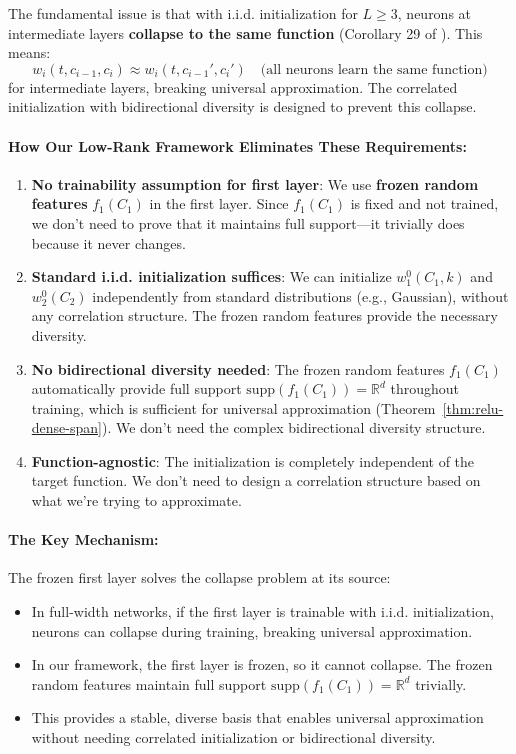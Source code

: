 \documentclass[11pt]{article}
\newcommand{\1}{\mathbbm{1}}
\begin{document}
The fundamental issue is that with i.i.d. initialization for $L \ge 3$, neurons at intermediate layers \textbf{collapse to the same function} (Corollary 29 of \cite{nguyen2023rigorousframeworkmeanfield}). This means:
\[
w_i(t, c_{i-1}, c_i) \approx w_i(t, c_{i-1}', c_i') \quad \text{(all neurons learn the same function)}
\]
for intermediate layers, breaking universal approximation. The correlated initialization with bidirectional diversity is designed to prevent this collapse.

\paragraph*{How Our Low-Rank Framework Eliminates These Requirements:}

\begin{enumerate}
\item \textbf{No trainability assumption for first layer}: We use \textbf{frozen random features} $f_1(C_1)$ in the first layer. Since $f_1(C_1)$ is fixed and not trained, we don't need to prove that it maintains full support---it trivially does because it never changes.

\item \textbf{Standard i.i.d. initialization suffices}: We can initialize $w_1^0(C_1, k)$ and $w_2^0(C_2)$ independently from standard distributions (e.g., Gaussian), without any correlation structure. The frozen random features provide the necessary diversity.

\item \textbf{No bidirectional diversity needed}: The frozen random features $f_1(C_1)$ automatically provide full support $\text{supp}(f_1(C_1)) = \mathbb{R}^d$ throughout training, which is sufficient for universal approximation (Theorem~\ref{thm:relu-dense-span}). We don't need the complex bidirectional diversity structure.

\item \textbf{Function-agnostic}: The initialization is completely independent of the target function. We don't need to design a correlation structure based on what we're trying to approximate.
\end{enumerate}

\paragraph*{The Key Mechanism:}

The frozen first layer solves the collapse problem at its source:
\begin{itemize}
\item In full-width networks, if the first layer is trainable with i.i.d. initialization, neurons can collapse during training, breaking universal approximation.
\item In our framework, the first layer is frozen, so it cannot collapse. The frozen random features maintain full support $\text{supp}(f_1(C_1)) = \mathbb{R}^d$ trivially.
\item This provides a stable, diverse basis that enables universal approximation without needing correlated initialization or bidirectional diversity.
\end{itemize}
\end{document}
